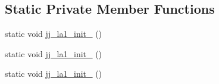 \subsection*{Static Private Member Functions}
\begin{DoxyCompactItemize}
\item 
static void \hyperlink{classde_1_1uulm_1_1ecs_1_1ai_1_1owlapi_1_1krssparser_1_1_k_r_s_s2_parser_a8645b8f12a857549533083e368c8dcbe}{jj\-\_\-la1\-\_\-init\-\_} ()
\item 
static void \hyperlink{classde_1_1uulm_1_1ecs_1_1ai_1_1owlapi_1_1krssparser_1_1_k_r_s_s2_parser_a7533589ff7125734ae539e1a17117942}{jj\-\_\-la1\-\_\-init\-\_} ()
\item 
static void \hyperlink{classde_1_1uulm_1_1ecs_1_1ai_1_1owlapi_1_1krssparser_1_1_k_r_s_s2_parser_a541b30039c29ec45f4e6830460858bb1}{jj\-\_\-la1\-\_\-init\-\_} ()
\end{DoxyCompactItemize}
